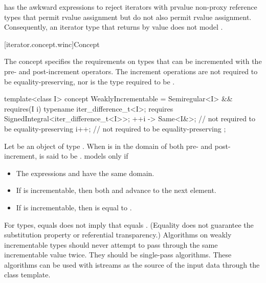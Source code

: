 \pnum
\begin{note}
 has the awkward  expressions to reject
iterators with prvalue non-proxy reference types that permit rvalue
assignment but do not also permit  rvalue assignment.
Consequently, an iterator type  that returns 
by value does not model .
\end{note}

[iterator.concept.winc]{Concept }

\pnum
The  concept specifies the requirements on
types that can be incremented with the pre- and post-increment operators.
The increment operations are not required to be equality-preserving,
nor is the type required to be .

%
\begin{codeblock}
template<class I>
  concept WeaklyIncrementable =
    Semiregular<I> &&
    requires(I i) {
      typename iter_difference_t<I>;
      requires SignedIntegral<iter_difference_t<I>>;
      { ++i } -> Same<I&>; // not required to be equality-preserving
      i++; // not required to be equality-preserving
    };
\end{codeblock}

\pnum
Let  be an object of type . When  is in the domain of
both pre- and post-increment,  is said to be .
 models  only if

\begin{itemize}
\item The expressions  and  have the same domain.
\item If  is incrementable, then both 
  and  advance  to the next element.
\item If  is incrementable, then
   is equal to
  .
\end{itemize}

\pnum
\begin{note}
For  types,  equals  does not imply that 
equals . (Equality does not guarantee the substitution property or referential
transparency.) Algorithms on weakly incrementable types should never attempt to pass
through the same incrementable value twice. They should be single-pass algorithms. These algorithms
can be used with istreams as the source of the input data through the  class
template.
\end{note}

